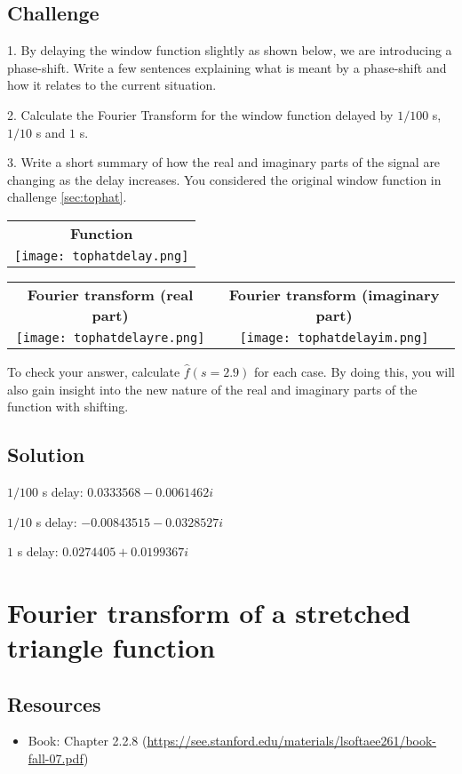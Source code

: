 \subsection*{Challenge}
1. By delaying the window function slightly as shown below, we are introducing a phase-shift. Write a few sentences explaining what is meant by a phase-shift and how it relates to the current situation.

2. Calculate the Fourier Transform for the window function delayed by $1/100$ s, $1/10$ s and $1$ s.

3. Write a short summary of how the real and imaginary parts of the signal are changing as the delay increases. You considered the original window function in challenge \ref{sec:tophat}.

\begin{tabular}{c}
    \textbf{Function} \\
    \texttt{[image: tophatdelay.png]}
\end{tabular}

\begin{tabular}{cc}
    \textbf{Fourier transform (real part)} & \textbf{Fourier transform (imaginary part)}\\
    \texttt{[image: tophatdelayre.png]} & \texttt{[image: tophatdelayim.png]}
\end{tabular}

To check your answer, calculate $\hat{f}(s=2.9)$ for each case. By doing this, you will also gain insight into the new nature of the real and imaginary parts of the function with shifting.

\subsection*{Solution}
$1/100$ s delay: $0.0333568 - 0.0061462i$

$1/10$ s delay: $-0.00843515 - 0.0328527i$

$1$ s delay: $0.0274405 + 0.0199367i$

\timebox




\newpage
\section{Fourier transform of a stretched triangle function}

\subsection*{Resources}
\begin{itemize}
    \item Book: Chapter 2.2.8 (\url{https://see.stanford.edu/materials/lsoftaee261/book-fall-07.pdf})
\end{itemize}

